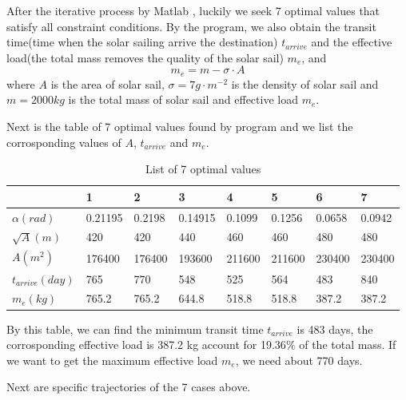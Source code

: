 \documentclass[../Paper.tex]{subfiles}
\begin{document}
After the iterative process by Matlab , luckily we seek 7 optimal values that satisfy all constraint conditions.
By the program, we also obtain the transit time(time when the solar sailing arrive the destination) 
$ t_{arrive} $ and the effective load(the total mass removes the quality of the solar sail) $ m_{e} $, and
$$ m_{e} = m - \sigma \cdot A $$
where $A$ is the area of solar sail, $ \sigma = 7g\cdot m^{-2} $ is the density of solar sail and 
$ m = 2000kg $ is the total mass of solar sail and effective load $m_{e}$. 

Next is the table of 7 optimal values found by program and we list the corrosponding values of $A$, $t_{arrive}$ and $m_{e}$.

\renewcommand\arraystretch{2} %
\begin{table}[H]
\centering
\scriptsize %
\begin{tabular}{ p{1.5cm}<{\centering}|p{1.5cm}<{\centering}|p{1.5cm}<{\centering}|p{1.5cm}<{\centering}|
				 p{1.5cm}<{\centering}|p{1.5cm}<{\centering}|p{1.5cm}<{\centering}|p{1.5cm}<{\centering}  }
\hline
  &  1  &  2  &  3  &  4  &  5   &  6  &  7 \\
\hline
$ \alpha(rad) $ & 0.21195 & 0.2198 & 0.14915 & 0.1099 & 0.1256 & 0.0658 & 0.0942 \\
\hline
$ \sqrt{A}(m) $ & 420 & 420 & 440 & 460 & 460 & 480 & 480 \\
\hline
$ A(m^2) $ & 176400 & 176400 & 193600 & 211600 & 211600 & 230400 & 230400 \\
\hline
$ t_{arrive}(day)  $ & 765 & 770 & 548 & 525 & 564 & 483 & 840 \\
\hline
$ m_{e}(kg) $ & 765.2 & 765.2 & 644.8 & 518.8 & 518.8 & 387.2 & 387.2 \\
\hline
\end{tabular}
\caption{List of 7 optimal values}
\label{Tableofoptimalvalues}
\end{table}  

By this table, we can find the minimum transit time $t_{arrive}$ is 483 days, the corrosponding 
effective load is 387.2 kg account for 19.36$\%$ of the total mass. If we want to get the 
maximum effective load $m_{e}$, we need about 770 days.

Next are specific trajectories of the 7 cases above.
\end{document}
